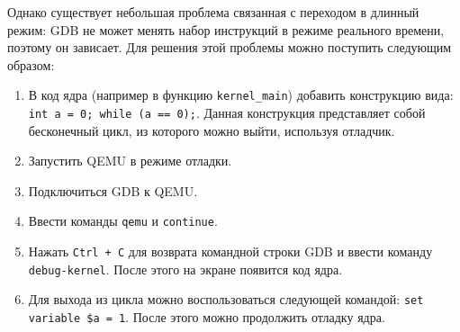 Однако существует небольшая проблема связанная с переходом в длинный режим: GDB не может менять набор инструкций
в режиме реального времени, поэтому он зависает. Для решения этой проблемы можно поступить следующим образом:
\begin{enumerate}[1.]
	\item В код ядра (например в функцию \texttt{kernel\_main}) добавить конструкцию вида:
		\texttt{int a = 0; while (a == 0);}. Данная конструкция представляет собой
		бесконечный цикл, из которого можно выйти, используя отладчик.
	\item Запустить QEMU в режиме отладки.
	\item Подключиться GDB к QEMU.
	\item Ввести команды \texttt{qemu} и \texttt{continue}.
	\item Нажать \texttt{Ctrl + C} для возврата командной строки GDB и ввести команду \texttt{debug-kernel}.
		После этого на экране появится код ядра.
	\item Для выхода из цикла можно воспользоваться следующей командой: \texttt{set variable \$a = 1}.
		После этого можно продолжить отладку ядра.
\end{enumerate}

